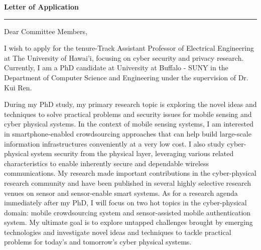 \documentclass[11pt]{letter} %
\begin{document}

\begin{letter}{} 



\begin{center}
\Large\bf Letter of Application %
\vspace{20pt} \hrule height 1pt %
\end{center} 

\signature{Si Chen\\
Department of Computer Science and Engineering\\
University at Buffalo - SUNY\\
301 Davis Hall, Buffalo NY\\
(716) 335-8052} %


\opening{Dear Committee Members,} 
 
I wish to apply for the tenure-Track Assistant Professor of Electrical Engineering at The University of Hawai'i, focusing on cyber security and privacy research. Currently, I am a PhD candidate at University at Buffalo - SUNY in the Department of Computer Science and Engineering under the supervision of Dr. Kui Ren. 


During my PhD study, my primary research topic is exploring the novel ideas and techniques to solve practical problems and security issues for mobile sensing and cyber physical systems. In the context of mobile sensing systems, I am interested in smartphone-enabled crowdsourcing approaches that can help build large-scale information infrastructures conveniently at a very low cost. I also study cyber-physical system security from the physical layer, leveraging various related characteristics to enable inherently secure and dependable wireless communications. My research made important contributions in the cyber-physical research community and have been published in several highly selective research venues on sensor and sensor-enable smart systems. As for a research agenda immediately after my PhD, I will focus on two hot topics in the cyber-physical domain: mobile crowdsourcing system and sensor-assisted mobile authentication system. My ultimate goal is to explore untapped challenges brought by emerging technologies and investigate novel ideas and techniques to tackle practical problems for today's and tomorrow's cyber physical systems.


\end{letter}
\end{document}
